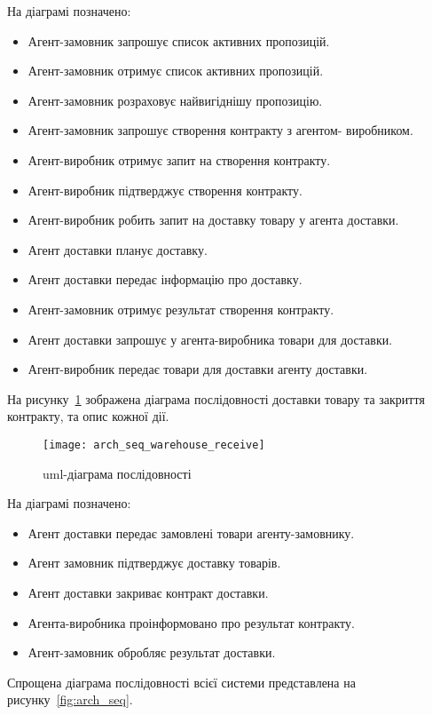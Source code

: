 На діаграмі позначено:
\begin{itemize}
	\item Агент-замовник запрошує список активних пропозицій.
	\item Агент-замовник отримує список активних пропозицій.
	\item Агент-замовник розраховує найвигіднішу пропозицію.
	\item Агент-замовник запрошує створення контракту з агентом-
	виробником.
	\item Агент-виробник отримує запит на створення контракту.
	\item Агент-виробник підтверджує створення контракту.
	\item Агент-виробник робить запит на доставку товару у агента
	доставки.
	\item Агент доставки планує доставку.
	\item Агент доставки передає інформацію про доставку.
	\item Агент-замовник отримує результат створення контракту.
	\item Агент доставки запрошує у агента-виробника товари для
	доставки.
	\item Агент-виробник передає товари для доставки агенту доставки.
\end{itemize}

На рисунку~\ref{fig:arch_seq_warehouse_receive} зображена діаграма послідовності доставки товару та закриття контракту, та опис кожної дії.

\begin{figure}[H]
	\centering
	\texttt{[image: arch\_seq\_warehouse\_receive]}
	\caption{\acrshort{uml}-діаграма послідовності}
	\label{fig:arch_seq_warehouse_receive}
\end{figure} 

На діаграмі позначено:
\begin{itemize}
	\item Агент доставки передає замовлені товари агенту-замовнику.
	\item Агент замовник підтверджує доставку товарів.
	\item Агент доставки закриває контракт доставки.
	\item Агента-виробника проінформовано про результат контракту. 
	\item Агент-замовник обробляє результат доставки.
\end{itemize}

Спрощена діаграма послідовності всієї системи представлена на рисунку~\ref{fig:arch_seq}.

